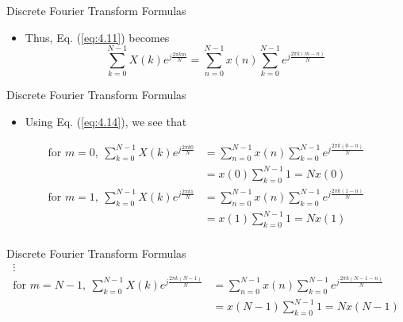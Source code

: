 \documentclass[pdflatex,compress,mathserif]{beamer}
\begin{document}
\begin{frame}{Discrete Fourier Transform Formulas}
    \begin{itemize}
        \item Thus, Eq. (\ref{eq:4.11}) becomes
        \begin{equation}
            \sum_{k=0}^{N-1} X(k)e^{j\frac{2\pi km}{N}} = \sum_{n=0}^{N-1} x(n) \sum_{k=0}^{N-1} e^{j\frac{2\pi k(m-n)}{N}}
            \label{eq:4.14}
        \end{equation}
    \end{itemize}
\end{frame}

\begin{frame}{Discrete Fourier Transform Formulas}
    \begin{itemize}
        \item Using Eq. (\ref{eq:4.14}), we see that
    \end{itemize}
    \begin{align*}
        \text{for } m = 0,~\sum_{k=0}^{N-1} X(k)e^{j\frac{2\pi k0}{N}} &= \sum_{n=0}^{N-1} x(n) \sum_{k=0}^{N-1} e^{j\frac{2\pi k(0-n)}{N}} \\
        &= x(0)\sum_{k=0}^{N-1}1 = Nx(0) \\
        \text{for } m = 1,~\sum_{k=0}^{N-1} X(k)e^{j\frac{2\pi k1}{N}} &= \sum_{n=0}^{N-1} x(n) \sum_{k=0}^{N-1} e^{j\frac{2\pi k(1-n)}{N}} \\
        &= x(1)\sum_{k=0}^{N-1}1 = Nx(1) \\
    \end{align*}
\end{frame}

\begin{frame}{Discrete Fourier Transform Formulas}
    \begin{align*}
        \vdots\\
        \text{for } m = N-1,~\sum_{k=0}^{N-1} X(k)e^{j\frac{2\pi k(N-1)}{N}} &= \sum_{n=0}^{N-1} x(n) \sum_{k=0}^{N-1} e^{j\frac{2\pi k(N-1-n)}{N}} \\
        &= x(N-1)\sum_{k=0}^{N-1}1 = Nx(N-1) \\
    \end{align*}
\end{frame}
\end{document}
